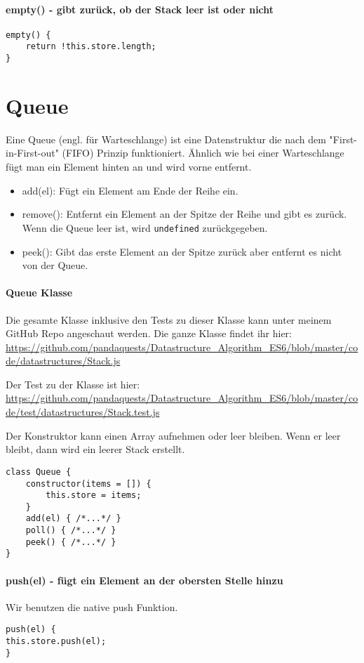 \documentclass[babel]{book}
\begin{document}
\paragraph{empty() - gibt zurück, ob der Stack leer ist oder nicht} 
\begin{lstlisting}[caption=Array Konstruktor]
empty() {
	return !this.store.length;
}
\end{lstlisting}

\section{Queue}
Eine Queue (engl. für Warteschlange) ist eine Datenstruktur die nach dem "First-in-First-out" (FIFO) Prinzip funktioniert. Ähnlich wie bei einer Warteschlange fügt man ein Element hinten an und wird vorne entfernt.

\begin{itemize} 
	\item add(el): Fügt ein Element am Ende der Reihe ein.
	\item remove(): Entfernt ein Element an der Spitze der Reihe und gibt es zurück. Wenn die Queue leer ist, wird \lstinline|undefined| zurückgegeben.
	\item peek(): Gibt das erste Element an der Spitze zurück aber entfernt es nicht von der Queue.
\end{itemize}

\paragraph{Queue Klasse}
Die gesamte Klasse inklusive den Tests zu dieser Klasse kann unter meinem GitHub Repo angeschaut werden. Die ganze Klasse findet ihr hier: \url{https://github.com/pandaquests/Datastructure_Algorithm_ES6/blob/master/code/datastructures/Stack.js}

Der Test zu der Klasse ist hier: \url{https://github.com/pandaquests/Datastructure_Algorithm_ES6/blob/master/code/test/datastructures/Stack.test.js}

Der Konstruktor kann einen Array aufnehmen oder leer bleiben. Wenn er leer bleibt, dann wird ein leerer Stack erstellt.

\begin{lstlisting}[caption=Array Konstruktor]
class Queue {
	constructor(items = []) {
		this.store = items;
	}
	add(el) { /*...*/ }
	poll() { /*...*/ }
	peek() { /*...*/ }
}
\end{lstlisting}

\paragraph{push(el) - fügt ein Element an der obersten Stelle hinzu} Wir benutzen die native push Funktion.
\begin{lstlisting}[caption=Array Konstruktor]
push(el) {
this.store.push(el);
}
\end{lstlisting}
\end{document}
